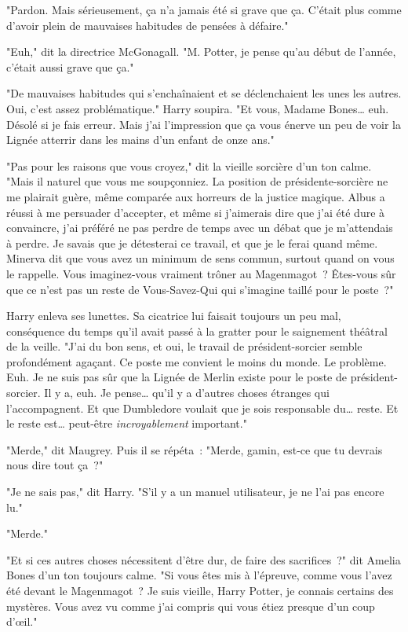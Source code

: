 "Pardon. Mais sérieusement, ça n'a jamais été si grave que ça. C'était plus comme d'avoir plein de mauvaises habitudes de pensées à défaire."

"Euh," dit la directrice McGonagall. "M. Potter, je pense qu'au début de l'année, c'était aussi grave que ça."

"De mauvaises habitudes qui s'enchaînaient et se déclenchaient les unes les autres. Oui, c'est assez problématique." Harry soupira. "Et vous, Madame Bones… euh. Désolé si je fais erreur. Mais j'ai l'impression que ça vous énerve un peu de voir la Lignée atterrir dans les mains d'un enfant de onze ans."

"Pas pour les raisons que vous croyez," dit la vieille sorcière d'un ton calme. "Mais il naturel que vous me soupçonniez. La position de présidente-sorcière ne me plairait guère, même comparée aux horreurs de la justice magique. Albus a réussi à me persuader d'accepter, et même si j'aimerais dire que j'ai été dure à convaincre, j'ai préféré ne pas perdre de temps avec un débat que je m'attendais à perdre. Je savais que je détesterai ce travail, et que je le ferai quand même. Minerva dit que vous avez un minimum de sens commun, surtout quand on vous le rappelle. Vous imaginez-vous vraiment trôner au Magenmagot~? Êtes-vous sûr que ce n'est pas un reste de Vous-Savez-Qui qui s'imagine taillé pour le poste~?"

Harry enleva ses lunettes. Sa cicatrice lui faisait toujours un peu mal, conséquence du temps qu'il avait passé à la gratter pour le saignement théâtral de la veille. "J'ai du bon sens, et oui, le travail de président-sorcier semble profondément agaçant. Ce poste me convient le moins du monde. Le problème. Euh. Je ne suis pas sûr que la Lignée de Merlin existe pour le poste de président-sorcier. Il y a, euh. Je pense… qu'il y a d'autres choses étranges qui l'accompagnent. Et que Dumbledore voulait que je sois responsable du… reste. Et le reste est… peut-être \emph{incroyablement} important."

"Merde," dit Maugrey. Puis il se répéta~: "Merde, gamin, est-ce que tu devrais nous dire tout ça~?"

"Je ne sais pas," dit Harry. "S'il y a un manuel utilisateur, je ne l'ai pas encore lu."

"Merde."

"Et si ces autres choses nécessitent d'être dur, de faire des sacrifices~?" dit Amelia Bones d'un ton toujours calme. "Si vous êtes mis à l'épreuve, comme vous l'avez été devant le Magenmagot~? Je suis vieille, Harry Potter, je connais certains des mystères. Vous avez vu comme j'ai compris qui vous étiez presque d'un coup d'œil."

